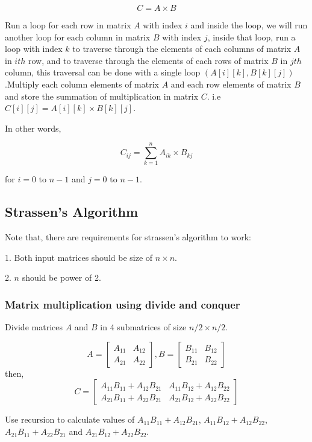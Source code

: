\documentclass[conference]{IEEEtran}
\begin{document}
\[C = A \times B\]

Run a loop for each row in matrix $A$ with index $i$ and inside the loop, we will run another loop for each column in matrix $B$ with index $j$, inside that loop, run a loop with index $k$ to traverse through the elements of each columns of matrix $A$ in $ith$ row, and to traverse through the elements of each rows of matrix $B$ in $jth$ column, this traversal can be done with a single loop $(A[i][k], B[k][j])$.Multiply each column elements of matrix $A$ and each row elements of matrix $B$ and store the summation of multiplication in matrix $C$. i.e $C[i][j] = A[i][k] \times B[k][j]$.

In other words,

\[C_{ij} = \sum_{k=1}^{n}{A_{ik} \times B_{kj}}\]

for $i = 0$ to $n-1$ and $j = 0$ to $n-1$.

\subsection{Strassen's Algorithm}
Note that, there are requirements for strassen's algorithm to work:

1. Both input matrices should be size of $n\times n$.

2. $n$ should be power of 2.
\subsubsection{Matrix multiplication using divide and conquer}

Divide matrices $A$ and $B$ in 4 submatrices of size $n/2 \times n/2$.

\[
A = \begin{bmatrix}
A_{11} & A_{12}\\
A_{21} & A_{22}
\end{bmatrix}
,
B = \begin{bmatrix}
B_{11} & B_{12}\\
B_{21} & B_{22}
\end{bmatrix}
\]
then,
\[
C = \begin{bmatrix}
A_{11}B_{11}+A_{12}B_{21} & A_{11}B_{12}+A_{12}B_{22}\\
A_{21}B_{11}+A_{22}B_{21} & A_{21}B_{12}+A_{22}B_{22}
\end{bmatrix}
\]

\newline
Use recursion to calculate values of $A_{11}B_{11}+A_{12}B_{21}$, $A_{11}B_{12}+A_{12}B_{22}$, $A_{21}B_{11}+A_{22}B_{21}$ and $A_{21}B_{12}+A_{22}B_{22}$.
\end{document}
